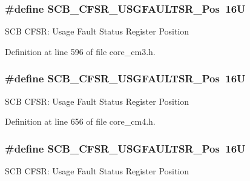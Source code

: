 \subsubsection[{\texorpdfstring{S\+C\+B\+\_\+\+C\+F\+S\+R\+\_\+\+U\+S\+G\+F\+A\+U\+L\+T\+S\+R\+\_\+\+Pos}{SCB_CFSR_USGFAULTSR_Pos}}]{\setlength{\rightskip}{0pt plus 5cm}\#define S\+C\+B\+\_\+\+C\+F\+S\+R\+\_\+\+U\+S\+G\+F\+A\+U\+L\+T\+S\+R\+\_\+\+Pos~16U}\hypertarget{group___c_m_s_i_s___s_c_b_gac8e4197b295c8560e68e2d71285c7879}{}\label{group___c_m_s_i_s___s_c_b_gac8e4197b295c8560e68e2d71285c7879}
S\+CB C\+F\+SR\+: Usage Fault Status Register Position 

Definition at line 596 of file core\+\_\+cm3.\+h.

\subsubsection[{\texorpdfstring{S\+C\+B\+\_\+\+C\+F\+S\+R\+\_\+\+U\+S\+G\+F\+A\+U\+L\+T\+S\+R\+\_\+\+Pos}{SCB_CFSR_USGFAULTSR_Pos}}]{\setlength{\rightskip}{0pt plus 5cm}\#define S\+C\+B\+\_\+\+C\+F\+S\+R\+\_\+\+U\+S\+G\+F\+A\+U\+L\+T\+S\+R\+\_\+\+Pos~16U}\hypertarget{group___c_m_s_i_s___s_c_b_gac8e4197b295c8560e68e2d71285c7879}{}\label{group___c_m_s_i_s___s_c_b_gac8e4197b295c8560e68e2d71285c7879}
S\+CB C\+F\+SR\+: Usage Fault Status Register Position 

Definition at line 656 of file core\+\_\+cm4.\+h.

\subsubsection[{\texorpdfstring{S\+C\+B\+\_\+\+C\+F\+S\+R\+\_\+\+U\+S\+G\+F\+A\+U\+L\+T\+S\+R\+\_\+\+Pos}{SCB_CFSR_USGFAULTSR_Pos}}]{\setlength{\rightskip}{0pt plus 5cm}\#define S\+C\+B\+\_\+\+C\+F\+S\+R\+\_\+\+U\+S\+G\+F\+A\+U\+L\+T\+S\+R\+\_\+\+Pos~16U}\hypertarget{group___c_m_s_i_s___s_c_b_gac8e4197b295c8560e68e2d71285c7879}{}\label{group___c_m_s_i_s___s_c_b_gac8e4197b295c8560e68e2d71285c7879}
S\+CB C\+F\+SR\+: Usage Fault Status Register Position 

